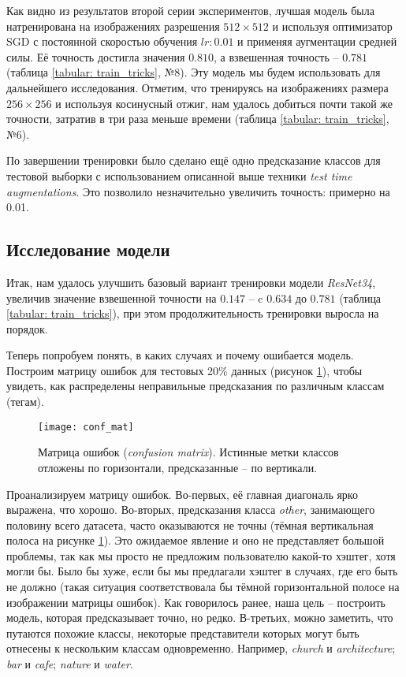 \indent
\indent
Как видно из результатов второй серии экспериментов, лучшая модель
была натренирована на изображениях разрешения
$512 \times 512$ и используя
оптимизатор SGD с постоянной скоростью обучения $lr: 0.01$ и применяя
аугментации средней силы. Её точность достигла значения $0.810$, а
взвешенная точность -- $0.781$ (таблица \ref{tabular: train_tricks}, №8).
Эту модель мы будем использовать для дальнейшего исследования.
Отметим, что тренируясь на изображениях размера $256 \times 256$ и 
используя косинусный отжиг, нам удалось добиться почти такой же точности,
затратив в три раза меньше времени (таблица \ref{tabular: train_tricks}, №6).


\indent
\indent
По завершении тренировки было сделано ещё одно предсказание классов
для тестовой выборки с использованием описанной выше техники
\textit{test time augmentations}. Это позволило незначительно увеличить
точность: примерно на 0.01.


\subsection{Исследование модели}


\indent
\indent
Итак, нам удалось улучшить базовый
вариант тренировки модели \textit{ResNet34},
увеличив значение взвешенной точности на $0.147$ -- 
 c $0.634$ до $0.781$ (таблица \ref{tabular: train_tricks}), 
при этом продолжительность 
тренировки выросла на порядок.


\indent
\indent
Теперь попробуем понять, в каких случаях и почему
 ошибается модель. Построим матрицу ошибок
 для тестовых 20\% данных
(рисунок \ref{tikzpicture: conf_mat}),
чтобы увидеть,  как распределены неправильные
предсказания по различным классам (тегам).


\begin{figure}[h!]
    \begin{center}
   	    \texttt{[image: conf\_mat]}
   	\end{center}
   	\caption{Матрица ошибок (\textit{confusion matrix}). Истинные метки 
   	               классов отложены по горизонтали, предсказанные -- по вертикали.}
   	\label{tikzpicture: conf_mat}
\end{figure}


\indent
\indent
Проанализируем матрицу ошибок.
Во-первых, её главная диагональ ярко выражена, что хорошо.
Во-вторых, предсказания класса \textit{other},
занимающего половину всего датасета, часто оказываются не 
точны (тёмная вертикальная полоса на рисунке \ref{tikzpicture: conf_mat}).
Это ожидаемое явление и оно не представляет большой проблемы, так как
мы просто не предложим пользователю какой-то хэштег, хотя могли бы.
Было бы хуже, если бы мы предлагали хэштег в случаях, где его 
быть не должно (такая ситуация соответствовала бы тёмной горизонтальной 
полосе на изображении матрицы ошибок).
Как говорилось ранее, наша цель -- построить модель, которая
предсказывает точно, но редко.
В-третьих, можно заметить, что путаются похожие классы, 
некоторые представители
которых могут быть отнесены к нескольким классам одновременно.
Например, \textit{church} и \textit{architecture}; \textit{bar} и \textit{cafe};
\textit{nature} и \textit{water}.



